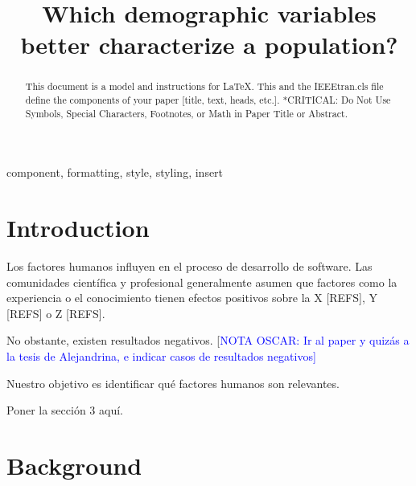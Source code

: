 \documentclass[10pt,conference]{IEEEtran}\usepackage[]{graphicx}\usepackage[table,xcdraw]{xcolor}
\newcommand{\odnote}[1]{[\textcolor{blue}{NOTA OSCAR: #1]~}}
\begin{document}
\title{Which demographic variables better characterize a population?}

\author{
\and
{}
\and
{}
}

\maketitle

\begin{abstract}
This document is a model and instructions for \LaTeX.
This and the IEEEtran.cls file define the components of your paper [title, text, heads, etc.]. *CRITICAL: Do Not Use Symbols, Special Characters, Footnotes, 
or Math in Paper Title or Abstract.
\end{abstract}

\begin{IEEEkeywords}
component, formatting, style, styling, insert
\end{IEEEkeywords}

\section{Introduction}

Los factores humanos influyen en el proceso de desarrollo de software. Las comunidades científica y profesional generalmente asumen que factores como la experiencia o el conocimiento tienen efectos positivos sobre la X [REFS], Y [REFS] o Z [REFS].

No obstante, existen resultados negativos. \odnote{Ir al paper y quizás a la tesis de Alejandrina, e indicar casos de resultados negativos}

Nuestro objetivo es identificar qué factores humanos son relevantes.

Poner la sección 3 aquí.


\section{Background}\label{sec:background}
\end{document}
